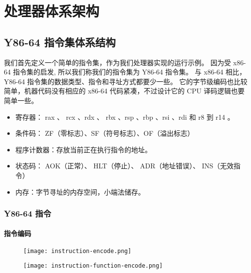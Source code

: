 \section{处理器体系架构}

\subsection{Y86-64 指令集体系结构}

我们首先定义一个简单的指令集，作为我们处理器实现的运行示例。
因为受 x86-64 指令集的启发, 所以我们称我们的指令集为 Y86-64 指令集。
与 x86-64 相比， Y86-64 指令集的数据类型、指令和寻址方式都要少一些。
它的字节级编码也比较简单，机器代码没有相应的 x86-64 代码紧凑，不过设计它的 CPU 译码逻辑也要简单一些。
\begin{itemize}
    \item 寄存器： rax 、 rcx 、rdx 、 rbx 、rsp 、rbp 、rsi 、rdi 和 r8 到 r14 。
    \item 条件码： ZF（零标志）、SF（符号标志）、OF（溢出标志）
    \item 程序计数器：存放当前正在执行指令的地址。
    \item 状态码： AOK（正常）、 HLT（停止）、 ADR（地址错误）、 INS（无效指令）
    \item 内存：字节寻址的内存空间，小端法储存。
\end{itemize}

\subsubsection{Y86-64 指令}
\paragraph{指令编码}
\begin{figure}[H]
    \centering
    \texttt{[image: instruction-encode.png]}
\end{figure}
\begin{figure}[H]
    \centering
    \texttt{[image: instruction-function-encode.png]}
\end{figure}

